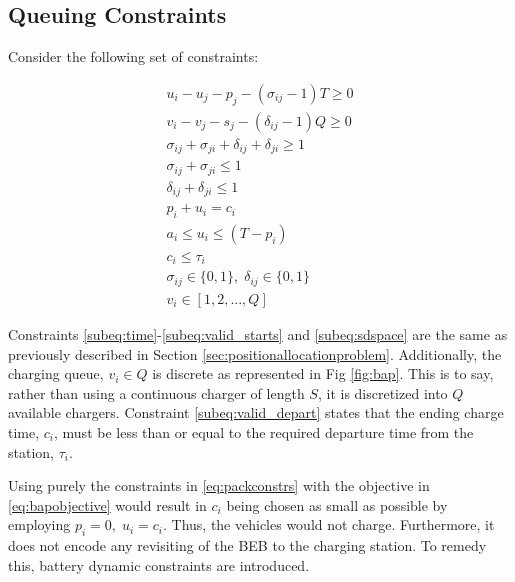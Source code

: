 \documentclass[letterpaper, 10pt, conference]{IEEEtran}
\begin{document}
\subsection{Queuing Constraints}
\noindent
Consider the following set of constraints:

\begin{subequations}
\label{eq:packconstrs}
\begin{align}
    u_i - u_j - p_j - (\sigma_{ij} - 1)T \geq 0                      \label{subeq:time}         \\
    v_i - v_j - s_j - (\delta_{ij} - 1)Q \geq 0                      \label{subeq:space}        \\
    \sigma_{ij} + \sigma_{ji} + \delta_{ij} + \delta_{ji} \geq 1     \label{subeq:valid_pos}    \\
    \sigma_{ij} + \sigma_{ji} \leq 1                                 \label{subeq:sigma}        \\
    \delta_{ij} + \delta_{ji} \leq 1                                 \label{subeq:delta}        \\
    p_i + u_i = c_i                                                  \label{subeq:detach}       \\
    a_i \leq u_i \leq (T - p_i)                                      \label{subeq:valid_starts} \\
    c_i \leq \tau_i                                                  \label{subeq:valid_depart} \\
    \sigma_{ij} \in \{0,1\},\;\delta_{ij} \in \{0,1\}                \label{subeq:sdspace}      \\
    v_i \in [1,2, ... , Q]                                           \label{subeq:vspace}
\end{align}
\end{subequations}

Constraints \eqref{subeq:time}-\eqref{subeq:valid_starts} and \eqref{subeq:sdspace} are the same as previously described
in Section \ref{sec:positionallocationproblem}. Additionally, the charging queue, $v_i \in Q$ is discrete as represented
in Fig \ref{fig:bap}. This is to say, rather than using a continuous charger of length $S$, it is discretized into $Q$
available chargers. Constraint \eqref{subeq:valid_depart} states that the ending charge time, $c_i$, must be less than
or equal to the required departure time from the station, $\tau_i$.

Using purely the constraints in \eqref{eq:packconstrs} with the objective in \eqref{eq:bapobjective} would result in
$c_i$ being chosen as small as possible by employing $p_i = 0,\; u_i = c_i$. Thus, the vehicles would not charge.
Furthermore, it does not encode any revisiting of the BEB to the charging station. To remedy this, battery dynamic
constraints are introduced.
\end{document}
